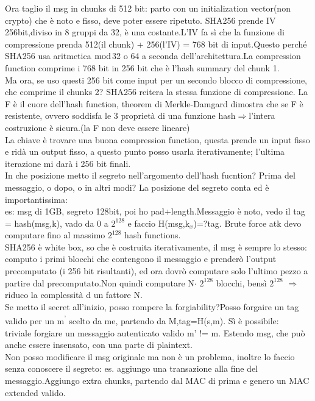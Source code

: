 \documentclass[16px]{article}
\begin{document}
Ora taglio il msg in chunks di 512 bit: parto con un initialization vector(non crypto) che è noto e fisso, deve poter essere ripetuto. SHA256 prende IV 256bit,diviso in 8 gruppi da 32, è una costante.L'IV fa sì che la funzione di compressione prenda 512(il chunk) + 256(l'IV) = 768 bit di input.Questo perché SHA256 usa aritmetica $\bmod$32 o 64 a seconda dell'architettura.La compression function comprime i 768 bit in 256 bit che è l'hash summary del chunk 1.\\
Ma ora, se uso questi 256 bit come input per un secondo blocco di compressione, che comprime il chunks 2? SHA256 reitera la stessa funzione di compressione.
La F è il cuore dell'hash function, theorem di Merkle-Damgard dimostra che se F è resistente, ovvero soddisfa le 3 proprietà di una funzione hash$\Rightarrow$l'intera costruzione è sicura.(la F non deve essere lineare)\\La chiave è trovare una buona compression function, questa prende un input fisso e ridà un output fisso, a questo punto posso usarla iterativamente; l'ultima iterazione mi darà i 256 bit finali.\\
In che posizione metto il segreto nell'argomento dell'hash fucntion? Prima del messaggio, o dopo, o in altri modi?
La posizione del segreto conta ed è importantissima:\\
es: msg di 1GB, segreto 128bit, poi ho pad+length.Messaggio è noto, vedo il tag = hash(msg,k), vado da 0 a $2^{128}$ e faccio H(msg,k$_{x}$)=?tag. Brute force atk devo computare fino al massimo $2^{128}$ hash functions.\\
SHA256 è white box, so che è costruita iterativamente, il msg è sempre lo stesso: computo i primi blocchi che contengono il messaggio e prenderò l'output precomputato (i 256 bit risultanti), ed ora dovrò computare solo l'ultimo pezzo a partire dal precomputato.Non quindi computare N$\cdot$ $2^{128}$ blocchi, bensì $2^{128}$ $\Rightarrow$ riduco la complessità d un fattore N.\\Se metto il secret all'inizio, posso rompere la forgiability?Posso forgaire un tag valido per un m\textsuperscript{'} scelto da me, partendo da M,tag=H(s,m). Sì è possibile:\\
triviale forgiare un messaggio autenticato valido
m' != m.
Estendo msg, che può anche essere insensato, con una parte di plaintext.\\
Non posso modificare il msg originale ma non è un problema, inoltre lo faccio senza conoscere il segreto: es. aggiungo una transazione alla fine del messaggio.Aggiungo extra chunks, partendo dal MAC di prima e genero un MAC extended valido.\\
\end{document}
